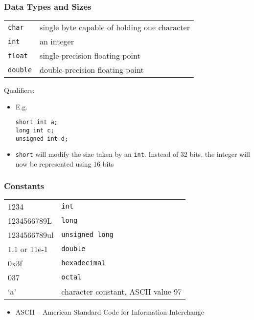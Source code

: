 \documentclass[11pt]{beamer}
\begin{document}
\begin{frame}[fragile]\frametitle{Data Types and Sizes}
\label{sec-1-10}


\begin{center}
\begin{tabular}{lp{9cm}}
 \verb~char~    &  single byte capable of holding one character  \\
 \verb~int~     &  an integer                                    \\
 \verb~float~   &  single-precision floating point               \\
 \verb~double~  &  double-precision floating point               \\
\end{tabular}
\end{center}



Qualifiers:
\begin{itemize}
\item E.g.

\begin{verbatim}
short int a;
long int c;
unsigned int d;
\end{verbatim}
\item \verb~short~ will modify the size taken by an \verb~int~. Instead of 32 bits, the integer will now be represented using 16 bits
\end{itemize}
\end{frame}
\begin{frame}[fragile]\frametitle{Constants}
\label{sec-1-11}


\begin{center}
\begin{tabular}{|l|l|}
 1234          &  \verb~int~                          \\
 1234566789L   &  \verb~long~                         \\
 1234566789ul  &  \verb~unsigned long~                \\
 1.1 or 11e-1  &  \verb~double~                       \\
 0x3f          &  \verb~hexadecimal~                  \\
 037           &  \verb~octal~                        \\
 `a'           &  character constant, ASCII value 97  \\
\end{tabular}
\end{center}


\begin{itemize}
\item ASCII -- American Standard Code for Information Interchange
\end{itemize}
\end{frame}
\end{document}
